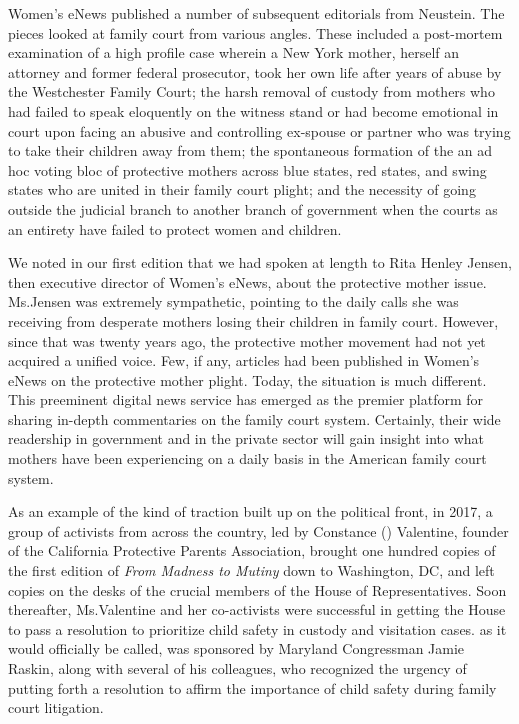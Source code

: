 Women's eNews published a number of subsequent editorials from
Neustein. The pieces looked at family court from various angles. These
included a post-mortem examination of a high profile case wherein a
New York mother, herself an attorney and former federal prosecutor,
took her own life after years of abuse by the Westchester Family Court;
the harsh removal of custody from mothers who had failed to speak
eloquently on the witness stand or had become emotional in court upon
facing an abusive and controlling ex-spouse or partner who was trying
to take their children away from them; the spontaneous formation of
the  an ad hoc voting bloc of protective mothers across
blue states, red states, and swing states who are united in their family
court plight; and the necessity of going outside the judicial branch to
another branch of government when the courts as an entirety have failed
to protect women and children. \pfl{}

\enlargethispage{5pt}We noted in our first edition that we had spoken at length to Rita
Henley Jensen, then executive director of Women's eNews, about the
protective mother issue. Ms.\@ Jensen was extremely sympathetic, pointing to the daily calls she was receiving from desperate mothers losing
their children in family court. However, since that was twenty years
ago, the protective mother movement had not yet acquired a unified
voice. Few, if any, articles had been published in Women's eNews on
the protective mother plight. Today, the situation is much different. This
preeminent digital news service has emerged as the premier platform for
sharing in-depth commentaries on the family court system. Certainly,
their wide readership in government and in the private sector will gain
insight into what mothers have been experiencing on a daily basis in the
American family court system. \pfl{}

\vspace{3em}


\noindent{}As an example of the kind of traction built up on the political front,
in 2017, a group of activists from across the country, led by Constance
() Valentine, founder of the California Protective Parents Association,
brought one hundred copies of the first edition of \textit{From Madness to
Mutiny} down to Washington, DC, and left copies on the desks of the
crucial members of the House of Representatives. Soon thereafter, 
Ms.\@ Valentine and her co-activists were successful in getting the House to
pass a resolution to prioritize child safety in custody and visitation cases.
 as it would officially be called, was sponsored by Maryland Congressman Jamie Raskin, along with several of his colleagues,
who recognized the urgency of putting forth a resolution to affirm the
importance of child safety during family court litigation. \pfl{}

